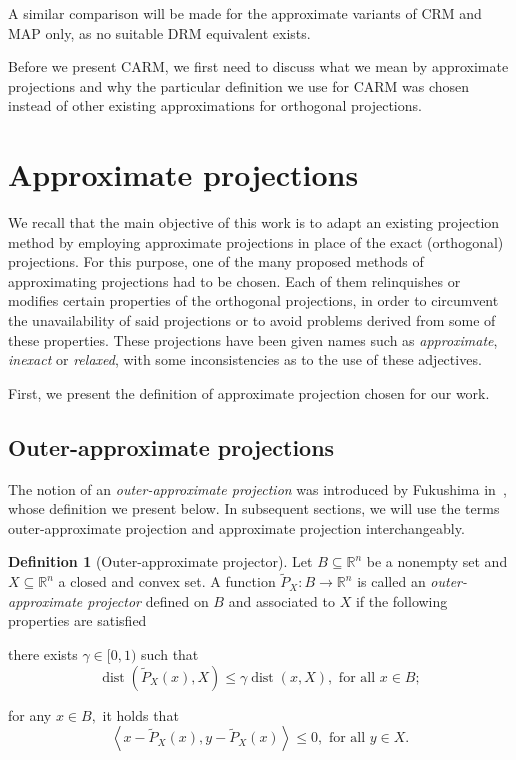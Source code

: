 \documentclass[smallextended,numbook,nospthms]{svjour3}
\theoremstyle{plain}
\theoremstyle{definition}
\newtheorem{definition}[theorem]{Definition}
\def\RR{\mathds R}
\DeclareMathOperator{\dist}{dist}
\newcommand{\scal}[2]{\left\langle{#1},{#2}  \right\rangle}
\begin{document}
A similar comparison will be made for the approximate variants of CRM and MAP only, as no suitable DRM equivalent exists.

Before we present CARM, we first need to discuss what we mean by approximate projections and why the particular definition we use for CARM was chosen instead of other existing approximations for orthogonal projections.

\newpage
\section{Approximate projections}\label{sec:approx proj}

We recall that the main objective of this work is to adapt an existing projection method by employing approximate projections in place of the exact (orthogonal) projections. For this purpose, one of the many proposed methods of approximating projections had to be chosen. 
Each of them relinquishes or modifies certain properties of the orthogonal projections, in order to circumvent the unavailability of said projections or to avoid problems derived from some of these properties. These projections have been given names such as \emph{approximate}, \emph{inexact} or \emph{relaxed}, with some inconsistencies as to the use of these adjectives.

First, we present the definition of approximate projection chosen for our work.

\subsection{Outer-approximate projections}
The notion of an \emph{outer-approximate projection} was introduced by Fukushima in~\cite[Lemma 4]{Fukushima:1983}, whose definition we present below. In subsequent sections, we will use the terms outer-approximate projection and approximate projection interchangeably. 
\begin{definition}[Outer-approximate projector]\label{def:approx proj}
	Let $B \subseteq \RR^{n}$ be a nonempty set and $X \subseteq \RR^{n}$ a closed and convex set. A function $\tilde{P}_{X}: B \rightarrow \RR^{n}$ is called an \emph{outer-approximate projector} defined on $B$ and associated to $X$ if the following properties are satisfied
	\begin{listi}
		\item there exists $\gamma \in [0,1)$ such that
		\begin{equation}
			\dist\left(\tilde{P}_{X}(x), X\right) \leq \gamma \dist(x, X), \text { for all } x \in B;
		\end{equation}
		\item  for any $x \in B,$ it holds that
		\begin{equation}
			\scal{x-\tilde{P}_{X}(x)}{y-\tilde{P}_{X}(x)} \leq 0, \text { for all } y \in X.
		\end{equation}
	\end{listi}
\end{definition}
\end{document}
